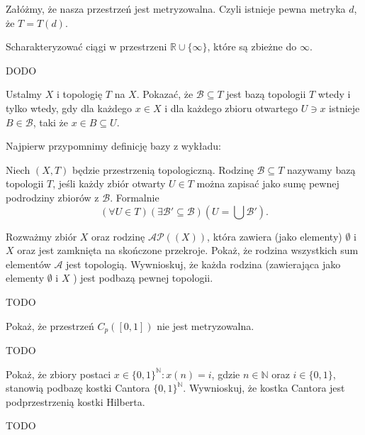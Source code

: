\begin{solution}
Załóżmy, że nasza przestrzeń jest metryzowalna. Czyli istnieje pewna metryka $d$, że $T = T\left( d \right) $.	
\end{solution} 
\begin{problem}[6]
	Scharakteryzować ciągi w przestrzeni $\mathbb{R}\cup \{\infty\} $, które są zbieżne do $\infty$.
\end{problem} 
\begin{solution}
	DODO
\end{solution} 
\begin{problem}[7]
	Ustalmy $X$ i topologię $T$ na $X$. Pokazać, że $\mathcal{B}\subseteq T$ jest bazą topologii $T$ wtedy i tylko wtedy, gdy dla każdego $x\in X$ i dla każdego zbioru otwartego $U \ni x$ istnieje $B \in \mathcal{B}$, taki że $x \in B \subseteq U$.
\end{problem} 
Najpierw przypomnimy definicję bazy z wykładu:
\begin{definition}
	Niech $\left( X,T \right) $ będzie przestrzenią topologiczną. Rodzinę $\mathcal{B} \subseteq T$ nazywamy bazą topologii $T$, jeśli każdy zbiór otwarty $U \in T$ można zapisać jako sumę pewnej podrodziny zbiorów z $\mathcal{B}$. Formalnie
	\[
	\left(\forall U \in T \right)\left(\exists \mathcal{B}' \subseteq \mathcal{B} \right)\left( U = \bigcup \mathcal{B}'  \right)   
	.\] 
\end{definition} 
\begin{problem}[8]
	Rozważmy zbiór $X$ oraz rodzinę $\mathcal{A} \mathcal{P}(\left( X \right) )$, która zawiera (jako elementy) $\emptyset$ i $X$ oraz jest zamknięta na skończone przekroje. Pokaż, że rodzina wszystkich sum elementów $\mathcal{A}$ jest topologią. Wywnioskuj, że każda rodzina (zawierająca jako elementy $\emptyset$ i $X$ ) jest podbazą pewnej topologii.
\end{problem} 
\begin{solution}
	TODO
\end{solution} 
\begin{problem}[9]
	Pokaż, że przestrzeń $C_{p}\left( \left[ 0,1 \right] \right) $ nie jest metryzowalna.
\end{problem} 
\begin{solution}
	TODO
\end{solution} 
\begin{problem}[10]
	Pokaż, że zbiory postaci $x\in \{0,1\}^{\mathbb{N}} : x\left( n \right) = i $, gdzie $n \in \mathbb{N}$ oraz $i \in \{0,1\} $, stanowią podbazę kostki Cantora $\{0,1\}^{\mathbb{N}}$. Wywnioskuj, że kostka Cantora jest podprzestrzenią kostki Hilberta.
\end{problem} 
\begin{solution}
	TODO
\end{solution} 
